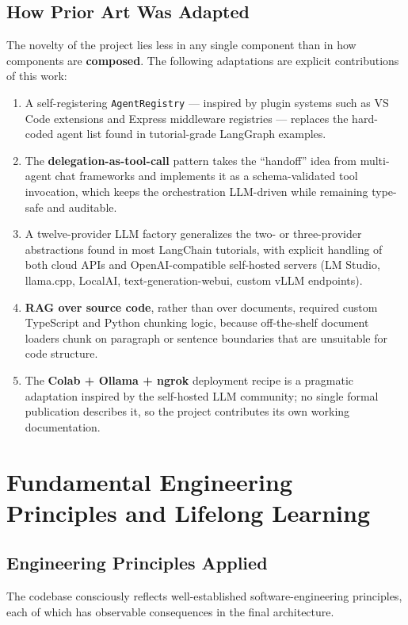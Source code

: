 \documentclass[11pt,a4paper]{report}
\newcommand{\code}[1]{\texttt{\small #1}}
\begin{document}
\subsection{How Prior Art Was Adapted}

The novelty of the project lies less in any single component than in how
components are \textbf{composed}. The following adaptations are explicit
contributions of this work:

\begin{enumerate}
  \item A self-registering \code{AgentRegistry} --- inspired by plugin systems such as VS Code extensions and Express middleware registries --- replaces the hard-coded agent list found in tutorial-grade LangGraph examples.
  \item The \textbf{delegation-as-tool-call} pattern takes the ``handoff'' idea from multi-agent chat frameworks and implements it as a schema-validated tool invocation, which keeps the orchestration LLM-driven while remaining type-safe and auditable.
  \item A twelve-provider LLM factory generalizes the two- or three-provider abstractions found in most LangChain tutorials, with explicit handling of both cloud APIs and OpenAI-compatible self-hosted servers (LM Studio, llama.cpp, LocalAI, text-generation-webui, custom vLLM endpoints).
  \item \textbf{RAG over source code}, rather than over documents, required custom TypeScript and Python chunking logic, because off-the-shelf document loaders chunk on paragraph or sentence boundaries that are unsuitable for code structure.
  \item The \textbf{Colab + Ollama + ngrok} deployment recipe is a pragmatic adaptation inspired by the self-hosted LLM community; no single formal publication describes it, so the project contributes its own working documentation.
\end{enumerate}

\section{Fundamental Engineering Principles and Lifelong Learning}

\subsection{Engineering Principles Applied}

The codebase consciously reflects well-established software-engineering
principles, each of which has observable consequences in the final
architecture.
\end{document}
